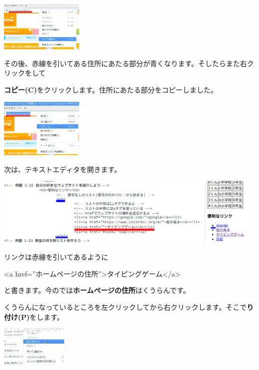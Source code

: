 \documentclass[a4paper,12pt]{jarticle}
\begin{document}
\bigskip

\centering
\includegraphics[width=0.3\textwidth]{textbook-img196.png}

\flushleft

その後、赤線を引いてある住所にあたる部分が青くなります。そしたらまた右クリックをして

\textbf{コピー(C)}をクリックします。住所にあたる部分をコピーしました。

\centering
\includegraphics[width=0.3\textwidth]{textbook-img197.png}

\bigskip
\flushleft

次は、テキストエディタを開きます。

\centering
\includegraphics[width=\textwidth]{textbook-img198.png}

\bigskip
\flushleft

リンクは赤線を引いてあるように

{\textless}a
href=”ホームページの住所”{\textgreater}タイピングゲーム{\textless}/a{\textgreater}

と書きます。今のでは\textbf{ホームページの住所}はくうらんです。

くうらんになっているところを左クリックしてから右クリックします。そこで\textbf{り付け(P)}をします。





\centering
\includegraphics[width=0.25\textwidth]{textbook-img199.png}
\end{document}
